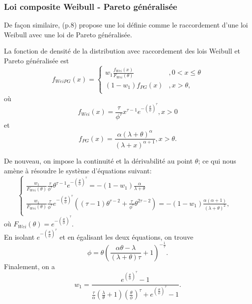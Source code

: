 	\subsubsection{Loi composite Weibull - Pareto généralisée} 
	De façon similaire, \cite{brazauskas2016modeling} (p.8) propose une loi définie comme le raccordement d'une loi Weibull avec une loi de Pareto généralisée.
	\begin{Definition}
		La fonction de densité de la distribution avec raccordement des lois Weibull et Pareto généralisée est
		$$
			f_{WeiPG}(x) = \left\{
			\begin{array}{ll}
				w_1 \frac{f_{Wei}(x)}{F_{Wei}(\theta)} & ,0 < x \leq \theta \\
				(1-w_1) {f_{PG}(x)}& , x > \theta, \\
			\end{array}
			\right.
		$$
		où $$f_{Wei}(x)= \frac{\tau}{\phi^{\tau}} x^{\tau -1} e^{- \left(\frac{\theta}{\phi}\right)^{\tau} }, x>0$$ et $$f_{PG}(x)=\frac{\alpha (\lambda +\theta)^{\alpha}}{(\lambda + x)^{\alpha+1}}, x>\theta. $$
	\end{Definition} 
	
	De nouveau, on impose la continuité et la dérivabilité au point $\theta$; ce qui nous amène à résoudre le système d'équations suivant:
	$$
		\left\{
		\begin{array}{ll}
			\frac{w_1}{F_{Wei}(\theta)}
			\frac{\tau}{\phi^{\tau}} \theta^{\tau -1} e^{- \left(\frac{\theta}{\phi}\right)^{\tau} }
			= -(1-w_1) \frac{\alpha}{\lambda + \theta} &  \\
			\frac{w_1}{F_{Wei}(\theta)}
			\frac{\tau}{\phi^{\tau}}  e^{- \left(\frac{\theta}{\phi}\right)^{\tau} }
			((\tau -1) \theta^{\tau -2}+\frac{\tau}{\phi^{\tau}} \theta^{2\tau -2})
			= -(1-w_1)  \frac{\alpha (\alpha +1)}{(\lambda+ \theta)^2}, & \\
		\end{array}
		\right.
	$$
	où $F_{Wei}(\theta) = e^{-\left(\frac{\theta}{\phi}\right)^{\tau}}$.\\
	
	En isolant $e^{- \left(\frac{\theta}{\phi}\right)^{\tau} }$ et en égalisant les deux équations, on trouve
	$$\phi = \theta \left(\frac{\alpha \theta - \lambda}{(\lambda + \theta)\tau}+1\right)^{- \frac{1}{\tau}}.$$
	Finalement, on a
	$$w_1 = \frac{e^{\left(\frac{\theta}{\phi}\right)^{\tau}}-1}{ \frac{\tau}{\alpha} (\frac{\lambda}{\theta} +1) \left(\frac{\theta}{\phi}\right)^{\tau} +
			e^{\left(\frac{\theta}{\phi}\right)^{\tau}}-1}.$$

